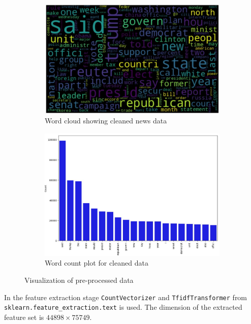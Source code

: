 \documentclass{josis}
\begin{document}
\begin{figure}
    \centering
    
    \begin{subfigure}[b]{0.45\textwidth}
        \centering
        \includegraphics[width=\textwidth]{word_count_after_cleaning.JPG}
        \caption{Word cloud showing cleaned news data}
        \label{fig:subfig3}
    \end{subfigure}
    \hfill
    \begin{subfigure}[b]{0.45\textwidth}
        \centering
        \includegraphics[width=\textwidth]{word_count_after_cleaning1.jpg}
        \caption{Word count plot for cleaned data}
        \label{fig:subfig4}
    \end{subfigure}
    
    \caption{Visualization of pre-processed data}
    \label{fig:mainfig2}
\end{figure}
In the feature extraction stage {\texttt{CountVectorizer}} and {\texttt{TfidfTransformer}} from {\texttt{sklearn.feature\_extraction.text}} is used. The dimension of the extracted feature set is $44898\times 75749$.
\end{document}
